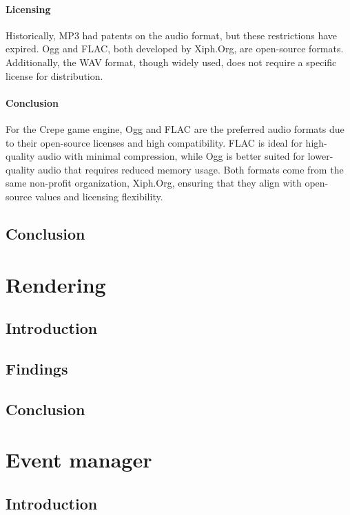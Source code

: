 \documentclass{projdoc}
\begin{document}
\paragraph{Licensing} Historically, MP3 had patents on the audio format, but these restrictions have expired. Ogg and FLAC, both developed by Xiph.Org, are open-source formats. Additionally, the WAV format, though widely used, does not require a specific license for distribution.

\paragraph{Conclusion} For the Crepe game engine, Ogg and FLAC are the preferred audio formats due to their open-source licenses and high compatibility. FLAC is ideal for high-quality audio with minimal compression, while Ogg is better suited for lower-quality audio that requires reduced memory usage. Both formats come from the same non-profit organization, Xiph.Org, ensuring that they align with open-source values and licensing flexibility.


\subsection{Conclusion}

\section{Rendering}

\subsection{Introduction}

\subsection{Findings}

\subsection{Conclusion}

\section{Event manager}

\subsection{Introduction}
\end{document}

